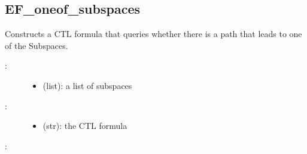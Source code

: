 \documentclass[letterpaper,10pt,english]{sphinxmanual}
\begin{document}
\subsection{EF\_oneof\_subspaces}
\label{\detokenize{QueryPatterns:ef-oneof-subspaces}}

\begin{fulllineitems}
\label{\detokenize{QueryPatterns:PyBoolNet.QueryPatterns.EF_oneof_subspaces}}
Constructs a CTL formula that queries whether there is a path that leads to one of the Subspaces.
\begin{description}
\item[{:}] \leavevmode\begin{itemize}
\item {} 
 (list): a list of subspaces

\end{itemize}

\item[{:}] \leavevmode\begin{itemize}
\item {} 
 (str): the CTL formula

\end{itemize}

\end{description}

:

\begin{sphinxVerbatim}[commandchars=\\\{\}]
  \PYG{p}{[} \PYG{p}{]}
 
\end{sphinxVerbatim}

\end{fulllineitems}
\end{document}
